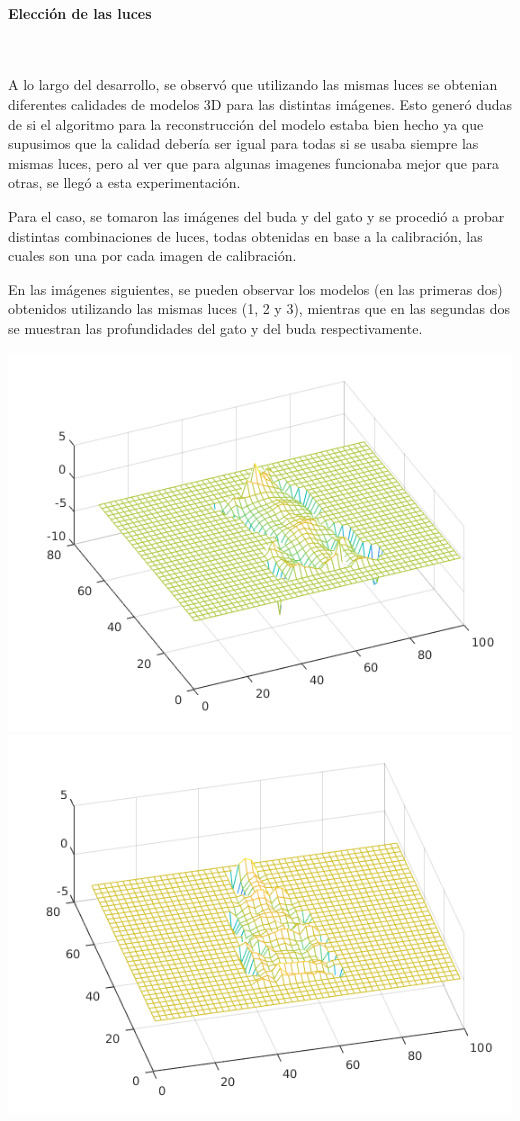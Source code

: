 \paragraph{Elección de las luces}
\

A lo largo del desarrollo, se observó que utilizando las mismas luces se obtenian diferentes calidades de modelos 3D para las distintas imágenes. Esto generó dudas de si el algoritmo para la reconstrucción del modelo estaba bien hecho ya que supusimos que la calidad debería ser igual para todas si se usaba siempre las mismas luces, pero al ver que para algunas imagenes funcionaba mejor que para otras, se llegó a esta experimentación.

Para el caso, se tomaron las imágenes del buda y del gato y se procedió a probar distintas combinaciones de luces, todas obtenidas en base a la calibración, las cuales son una por cada imagen de calibración.

En las imágenes siguientes, se pueden observar los modelos (en las primeras dos) obtenidos utilizando las mismas luces (1, 2 y 3), mientras que en las segundas dos se muestran las profundidades del gato y del buda respectivamente.

\begin{center}
\includegraphics[width=.4\linewidth]{imagenes/gato_small_model_123.png}
\includegraphics[width=.4\linewidth]{imagenes/buda_small_model_123.png}
\end{center}

